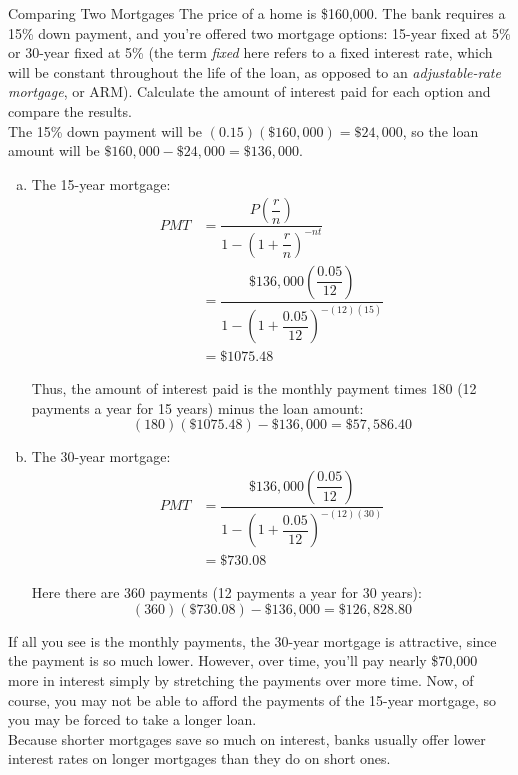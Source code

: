 \begin{example}[https://www.youtube.com/watch?v=J5Buue07f44]{Comparing Two Mortgages}
The price of a home is \$160,000.  The bank requires a 15\% down payment, and you're offered two mortgage options: 15-year fixed at 5\% or 30-year fixed at 5\% (the term \textit{fixed} here refers to a fixed interest rate, which will be constant throughout the life of the loan, as opposed to an \textit{adjustable-rate mortgage}, or ARM).  Calculate the amount of interest paid for each option and compare the results.\\

The 15\% down payment will be $(0.15)(\$160,000) = \$24,000$, so the loan amount will be $\$160,000-\$24,000 = \$136,000$.
\begin{enumerate}[(a)]
\item The 15-year mortgage:
\begin{align*}
PMT &= \dfrac{P\left(\dfrac{r}{n}\right)}{1-\left(1+\dfrac{r}{n}\right)^{-nt}}\\
&= \dfrac{\$136,000\left(\dfrac{0.05}{12}\right)}{1-\left(1+\dfrac{0.05}{12}\right)^{-(12)(15)}}\\
&= \$1075.48
\end{align*}

Thus, the amount of interest paid is the monthly payment times 180 (12 payments a year for 15 years) minus the loan amount:
\[(180)(\$1075.48)-\$136,000 = \$57,586.40\]

\item The 30-year mortgage:
\begin{align*}
PMT &= \dfrac{\$136,000\left(\dfrac{0.05}{12}\right)}{1-\left(1+\dfrac{0.05}{12}\right)^{-(12)(30)}}\\
&= \$730.08
\end{align*}

Here there are 360 payments (12 payments a year for 30 years):
\[(360)(\$730.08)-\$136,000 = \$126,828.80\]
\end{enumerate}

If all you see is the monthly payments, the 30-year mortgage is attractive, since the payment is so much lower.  However, over time, you'll pay nearly \$70,000 more in interest simply by stretching the payments over more time.  Now, of course, you may not be able to afford the payments of the 15-year mortgage, so you may be forced to take a longer loan.\\

Because shorter mortgages save so much on interest, banks usually offer lower interest rates on longer mortgages than they do on short ones.
\end{example}
\vfill
\pagebreak

